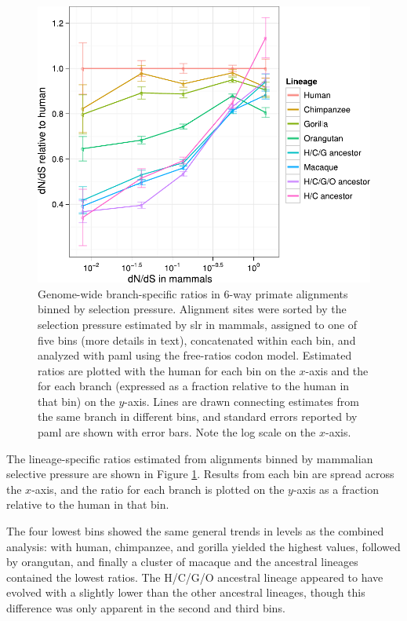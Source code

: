 \begin{figure}
\centering
\includegraphics[scale=0.9]{Figs/gorilla_dnds2.pdf}
\caption{Genome-wide branch-specific \dnds ratios in 6-way primate
  alignments binned by \sw selection pressure. Alignment sites were
  sorted by the \sw selection pressure estimated by \ac{slr} in
  mammals, assigned to one of five bins (more details in text),
  concatenated within each bin, and analyzed with \ac{paml} using the
  free-ratios codon model. Estimated \dnds ratios are plotted with the
  human \dnds for each bin on the $x$-axis and the \dnds for each branch
  (expressed as a fraction relative to the human \dnds in that bin) on
  the $y$-axis. Lines are drawn connecting estimates from the same
  branch in different bins, and standard errors reported by \ac{paml}
  are shown with error bars. Note the log scale on the $x$-axis.}
\label{fig_gorilla_dnds2}
\end{figure}

The lineage-specific \dnds ratios estimated from alignments binned by
\sw mammalian selective pressure are shown in Figure
\ref{fig_gorilla_dnds2}. Results from each bin are spread across the
$x$-axis, and the \dnds ratio for each branch is plotted on the $y$-axis
as a fraction relative to the human \dnds in that bin.

The four lowest \dnds bins showed the same general trends in \dnds
levels as the combined analysis: with human, chimpanzee, and gorilla
yielded the highest \dnds values, followed by orangutan, and finally a
cluster of macaque and the ancestral lineages contained the lowest
\dnds ratios. The H/C/G/O ancestral lineage appeared to have evolved
with a slightly lower \dnds than the other ancestral lineages, though
this difference was only apparent in the second and third bins.

